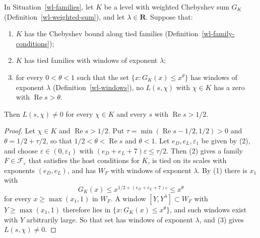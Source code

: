 \begin{theorem}\label{wl-level-from-windows}
In Situation~\ref{wl-families}, let $K$ be a level with weighted Chebyshev
sum $G_K$ (Definition~\ref{wl-weighted-sum}), and let $\lambda\in\mathbf R$.
Suppose that:
\begin{enumerate}
\item $K$ has the Chebyshev bound along tied families
  (Definition~\ref{wl-family-conditions});
\item $K$ has tied families with windows of exponent $\lambda$;
\item for every $0<\theta<1$ such that the set $\{x:G_K(x)\leq x^\theta\}$
  has windows of exponent $\lambda$ (Definition~\ref{wl-windows}), no
  $L(s,\chi)$ with $\chi\in K$ has a zero with $\operatorname{Re}s>\theta$.
\end{enumerate}
Then $L(s,\chi)\neq0$ for every $\chi\in K$ and every $s$ with
$\operatorname{Re}s>1/2$.
\end{theorem}
\begin{proof}
Let $\chi\in K$ and $\operatorname{Re}s>1/2$. Put
$\tau=\min(\operatorname{Re}s-1/2,1/2)>0$ and $\theta=1/2+\tau/2$, so that
$1/2<\theta<\operatorname{Re}s$ and $\theta<1$. Let $e_D,e_L,\varepsilon_1$
be given by (2), and choose $\varepsilon\in(0,\varepsilon_1)$ with
$(e_D+e_L+7)\varepsilon\leq\tau/2$. Then (2) gives a family
$F\in\mathcal F_\varepsilon$ that satisfies the host conditions for $K$, is
tied on its scales with exponents $(e_D,e_L)$, and has $W_F$ with windows of
exponent $\lambda$. By (1) there is $x_1$ with
\[
 G_K(x)\leq x^{1/2+(e_D+e_L+7)\varepsilon}\leq x^\theta
\]
for every $x\geq\max(x_1,1)$ in $W_F$. A window $[Y,Y^\lambda]\subset W_F$
with $Y\geq\max(x_1,1)$ therefore lies in $\{x:G_K(x)\leq x^\theta\}$, and
such windows exist with $Y$ arbitrarily large. So that set has windows of
exponent $\lambda$, and (3) gives $L(s,\chi)\neq0$.
\end{proof}

